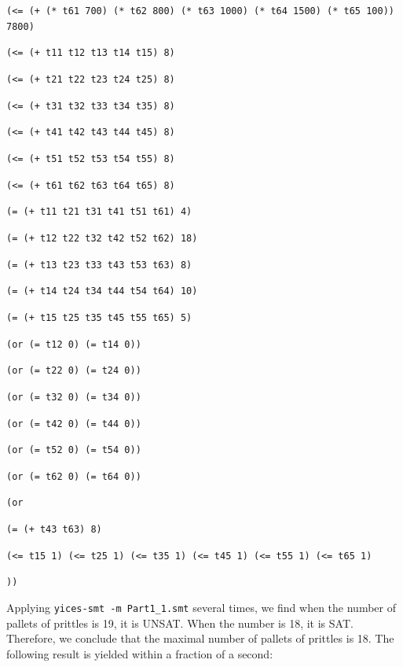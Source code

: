 \documentclass[11pt]{article}
\begin{document}
{{\tt (<= (+ (* t61 700) (* t62 800) (* t63 1000) (* t64 1500) (* t65 100)) 7800) }

{\tt (<= (+ t11 t12 t13 t14 t15) 8)}

{\tt (<= (+ t21 t22 t23 t24 t25) 8)}

{\tt (<= (+ t31 t32 t33 t34 t35) 8)}

{\tt (<= (+ t41 t42 t43 t44 t45) 8)}

{\tt (<= (+ t51 t52 t53 t54 t55) 8)}

{\tt (<= (+ t61 t62 t63 t64 t65) 8)}

{\tt (= (+ t11 t21 t31 t41 t51 t61) 4)}

{\tt (= (+ t12 t22 t32 t42 t52 t62) 18)}

{\tt (= (+ t13 t23 t33 t43 t53 t63) 8)}

{\tt (= (+ t14 t24 t34 t44 t54 t64) 10)}

{\tt (= (+ t15 t25 t35 t45 t55 t65) 5)}

{\tt (or (= t12 0) (= t14 0)) }

{\tt (or (= t22 0) (= t24 0)) }

{\tt (or (= t32 0) (= t34 0)) }

{\tt (or (= t42 0) (= t44 0)) }

{\tt (or (= t52 0) (= t54 0)) }

{\tt (or (= t62 0) (= t64 0)) }

{\tt (or}

{\tt (= (+ t43 t63) 8) }

{\tt (<= t15 1) (<= t25 1) (<= t35 1) (<= t45 1) (<= t55 1) (<= t65 1)}

{\tt )) }
}

Applying {\tt yices-smt -m Part1\_1.smt} several times, we find when the number of pallets of prittles is 19, it is UNSAT. When the number is 18, it is SAT. Therefore, we conclude that the maximal number of pallets of prittles is 18.
The following result is yielded within a fraction of a second:
\end{document}
